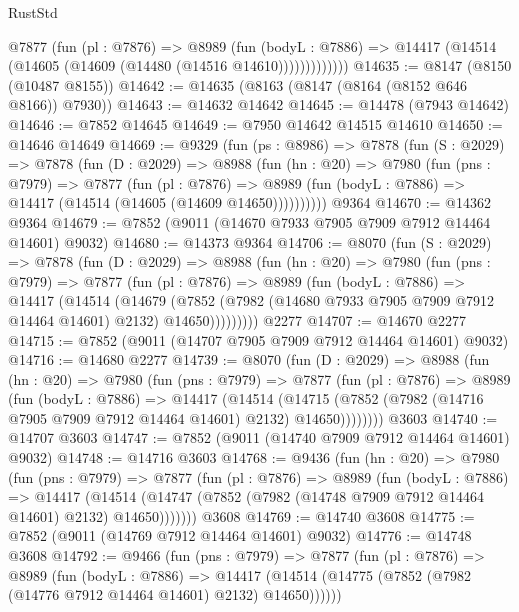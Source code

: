 \begin{lexlean}{RustStd}
\begin{coremodule}
              @7877
                (fun (pl : @7876) =>
                @8989
                  (fun (bodyL : @7886) =>
                  @14417 (@14514 (@14605 (@14609 (@14480 (@14516 @14610)))))))))))))
@14635 := @8147 (@8150 (@10487 @8155))
@14642 := @14635 (@8163 (@8147 (@8164 (@8152 @646 @8166)) @7930))
@14643 := @14632 @14642
@14645 := @14478 (@7943 @14642)
@14646 := @7852 @14645
@14649 := @7950 @14642 @14515 @14610
@14650 := @14646 @14649
@14669 := @9329
    (fun (ps : @8986) =>
    @7878
      (fun (S : @2029) =>
      @7878
        (fun (D : @2029) =>
        @8988
          (fun (hn : @20) =>
          @7980
            (fun (pns : @7979) =>
            @7877
              (fun (pl : @7876) =>
              @8989 (fun (bodyL : @7886) => @14417 (@14514 (@14605 (@14609 @14650))))))))))
    @9364
@14670 := @14362 @9364
@14679 := @7852 (@9011 (@14670 @7933 @7905 @7909 @7912 @14464 @14601) @9032)
@14680 := @14373 @9364
@14706 := @8070
    (fun (S : @2029) =>
    @7878
      (fun (D : @2029) =>
      @8988
        (fun (hn : @20) =>
        @7980
          (fun (pns : @7979) =>
          @7877
            (fun (pl : @7876) =>
            @8989
              (fun (bodyL : @7886) =>
              @14417
                (@14514
                  (@14679
                    (@7852
                      (@7982 (@14680 @7933 @7905 @7909 @7912 @14464 @14601) @2132)
                      @14650)))))))))
    @2277
@14707 := @14670 @2277
@14715 := @7852 (@9011 (@14707 @7905 @7909 @7912 @14464 @14601) @9032)
@14716 := @14680 @2277
@14739 := @8070
    (fun (D : @2029) =>
    @8988
      (fun (hn : @20) =>
      @7980
        (fun (pns : @7979) =>
        @7877
          (fun (pl : @7876) =>
          @8989
            (fun (bodyL : @7886) =>
            @14417
              (@14514
                (@14715 (@7852 (@7982 (@14716 @7905 @7909 @7912 @14464 @14601) @2132) @14650))))))))
    @3603
@14740 := @14707 @3603
@14747 := @7852 (@9011 (@14740 @7909 @7912 @14464 @14601) @9032)
@14748 := @14716 @3603
@14768 := @9436
    (fun (hn : @20) =>
    @7980
      (fun (pns : @7979) =>
      @7877
        (fun (pl : @7876) =>
        @8989
          (fun (bodyL : @7886) =>
          @14417
            (@14514 (@14747 (@7852 (@7982 (@14748 @7909 @7912 @14464 @14601) @2132) @14650)))))))
    @3608
@14769 := @14740 @3608
@14775 := @7852 (@9011 (@14769 @7912 @14464 @14601) @9032)
@14776 := @14748 @3608
@14792 := @9466
    (fun (pns : @7979) =>
    @7877
      (fun (pl : @7876) =>
      @8989
        (fun (bodyL : @7886) =>
        @14417 (@14514 (@14775 (@7852 (@7982 (@14776 @7912 @14464 @14601) @2132) @14650))))))

\end{coremodule}
\end{lexlean}
